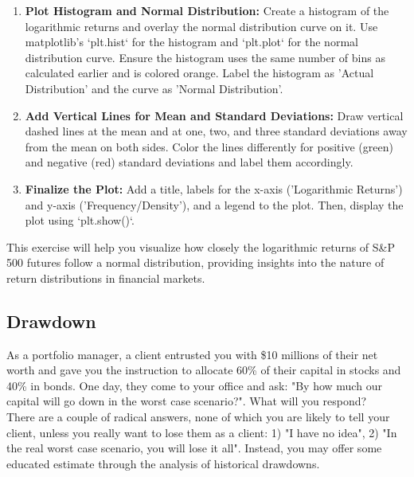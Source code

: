 \documentclass{article}
\begin{document}
\begin{enumerate}
    \item \textbf{Plot Histogram and Normal Distribution:}
    Create a histogram of the logarithmic returns and overlay the normal distribution curve on it. Use matplotlib's `plt.hist` for the histogram and `plt.plot` for the normal distribution curve. Ensure the histogram uses the same number of bins as calculated earlier and is colored orange. Label the histogram as 'Actual Distribution' and the curve as 'Normal Distribution'.

    \item \textbf{Add Vertical Lines for Mean and Standard Deviations:}
    Draw vertical dashed lines at the mean and at one, two, and three standard deviations away from the mean on both sides. Color the lines differently for positive (green) and negative (red) standard deviations and label them accordingly.

    \item \textbf{Finalize the Plot:}
    Add a title, labels for the x-axis ('Logarithmic Returns') and y-axis ('Frequency/Density'), and a legend to the plot. Then, display the plot using `plt.show()`.

\end{enumerate}

This exercise will help you visualize how closely the logarithmic returns of S\&P 500 futures follow a normal distribution, providing insights into the nature of return distributions in financial markets.


\clearpage

\subsection{Drawdown}

As a portfolio manager, a client entrusted you with \$10 millions of their net worth and gave you the instruction to allocate 60\% of their capital in stocks and 40\% in bonds. One day, they come to your office and ask: "By how much our capital will go down in the worst case scenario?". What will you respond? \\

There are a couple of radical answers, none of which you are likely to tell your client, unless you really want to lose them as a client: 1) "I have no idea", 2) "In the real worst case scenario, you will lose it all". Instead, you may offer some educated estimate through the analysis of historical drawdowns. \\
\end{document}
